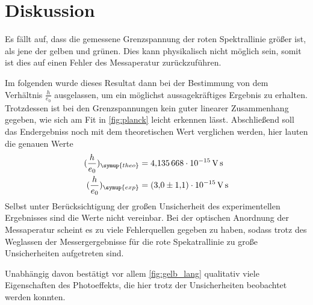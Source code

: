 \section{Diskussion}
\label{sec:Diskussion}

Es fällt auf, dass die gemessene Grenzspannung der roten Spektrallinie größer ist, als jene der gelben und grünen.
Dies kann physikalisch nicht möglich sein, somit ist dies auf einen Fehler des Messaperatur zurückzuführen.

Im folgenden wurde dieses Resultat dann bei der Bestimmung von dem Verhältnis $\frac{h}{e_0}$ ausgelassen,
um ein möglichst aussagekräftiges Ergebnis zu erhalten.
Trotzdessen ist bei den Grenzspannungen kein guter linearer Zusammenhang gegeben, wie sich am Fit in
\autoref{fig:planck} leicht erkennen lässt.
Abschließend soll das Endergebniss noch mit dem theoretischen Wert verglichen werden, hier lauten die genauen Werte
\begin{align*}
    (\frac{h}{e_0})_{\symup{theo}} &= \qty{4.135668e-15}{\volt\second}\\
    (\frac{h}{e_0})_{\symup{exp}} &= \qty{3.0(1.1)e-15}{\volt\second}
\end{align*}
Selbst unter Berücksichtigung der großen Unsicherheit des experimentellen Ergebnisses sind die Werte nicht vereinbar.
Bei der optischen Anordnung der Messaperatur scheint es zu viele Fehlerquellen gegeben zu haben, sodass trotz
des Weglassen der Messergergebnisse für die rote Spekatrallinie zu große Unsicherheiten aufgetreten sind.

Unabhängig davon bestätigt vor allem \autoref{fig:gelb_lang} qualitativ viele Eigenschaften des Photoeffekts,
die hier trotz der Unsicherheiten beobachtet werden konnten.
